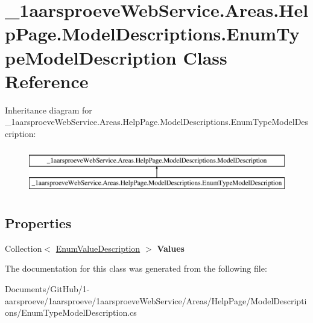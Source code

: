 \hypertarget{class__1aarsproeve_web_service_1_1_areas_1_1_help_page_1_1_model_descriptions_1_1_enum_type_model_description}{}\section{\+\_\+1aarsproeve\+Web\+Service.\+Areas.\+Help\+Page.\+Model\+Descriptions.\+Enum\+Type\+Model\+Description Class Reference}
\label{class__1aarsproeve_web_service_1_1_areas_1_1_help_page_1_1_model_descriptions_1_1_enum_type_model_description}
Inheritance diagram for \+\_\+1aarsproeve\+Web\+Service.\+Areas.\+Help\+Page.\+Model\+Descriptions.\+Enum\+Type\+Model\+Description\+:\begin{figure}[H]
\begin{center}
\leavevmode
\includegraphics[height=2.000000cm]{class__1aarsproeve_web_service_1_1_areas_1_1_help_page_1_1_model_descriptions_1_1_enum_type_model_description}
\end{center}
\end{figure}
\subsection*{Properties}
\begin{DoxyCompactItemize}
\item 
\hypertarget{class__1aarsproeve_web_service_1_1_areas_1_1_help_page_1_1_model_descriptions_1_1_enum_type_model_description_a0d1a08eead95b9223e53b77770bc8703}{}Collection$<$ \hyperlink{class__1aarsproeve_web_service_1_1_areas_1_1_help_page_1_1_model_descriptions_1_1_enum_value_description}{Enum\+Value\+Description} $>$ {\bfseries Values}\label{class__1aarsproeve_web_service_1_1_areas_1_1_help_page_1_1_model_descriptions_1_1_enum_type_model_description_a0d1a08eead95b9223e53b77770bc8703}

\end{DoxyCompactItemize}


The documentation for this class was generated from the following file\+:\begin{DoxyCompactItemize}
\item 
Documents/\+Git\+Hub/1-\/aarsproeve/1aarsproeve/1aarsproeve\+Web\+Service/\+Areas/\+Help\+Page/\+Model\+Descriptions/Enum\+Type\+Model\+Description.\+cs\end{DoxyCompactItemize}

